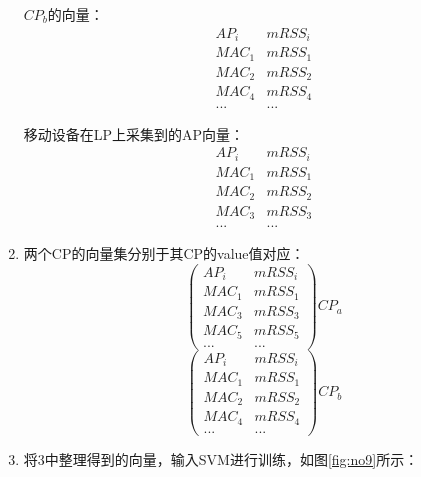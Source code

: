 \documentclass[UTF8, twocolumn ]{ctexart}
\begin{document}
\begin{enumerate}
\begin{equation}
  \end{equation}
  \par
  $CP_{b}$的向量：
  \begin{equation}
    \begin{array}{c|c}
      AP_{i} & mRSS_{i} \\ \hline
      MAC_{1} & mRSS_{1} \\
      MAC_{2} & mRSS_{2} \\
      MAC_{4} & mRSS_{4} \\
      ... & ...
    \end{array}
  \end{equation}
  \par
  移动设备在LP上采集到的AP向量：
  \begin{equation}
    \begin{array}{c|c}
      AP_{i} & mRSS_{i} \\ \hline
      MAC_{1} & mRSS_{1} \\
      MAC_{2} & mRSS_{2} \\
      MAC_{3} & mRSS_{3} \\
      ... & ...
    \end{array}
  \end{equation}
\item 两个CP的向量集分别于其CP的value值对应：
  \begin{equation}
    \left(
    \begin{array}{c|c}
      AP_{i} & mRSS_{i} \\ \hline
      MAC_{1} & mRSS_{1} \\
      MAC_{3} & mRSS_{3} \\
      MAC_{5} & mRSS_{5} \\
      ... & ...
    \end{array}
    \right)CP_{a}
  \end{equation}
  \begin{equation}
    \left(
    \begin{array}{c|c}
      AP_{i} & mRSS_{i} \\ \hline
      MAC_{1} & mRSS_{1} \\
      MAC_{2} & mRSS_{2} \\
      MAC_{4} & mRSS_{4} \\
      ... & ...
    \end{array}
    \right)CP_{b}
  \end{equation}
\item 将3中整理得到的向量，输入SVM进行训练，如图\ref{fig:no9}所示：
  \begin{figure}[!ht]\centering

\end{figure}
\end{enumerate}
\end{document}
